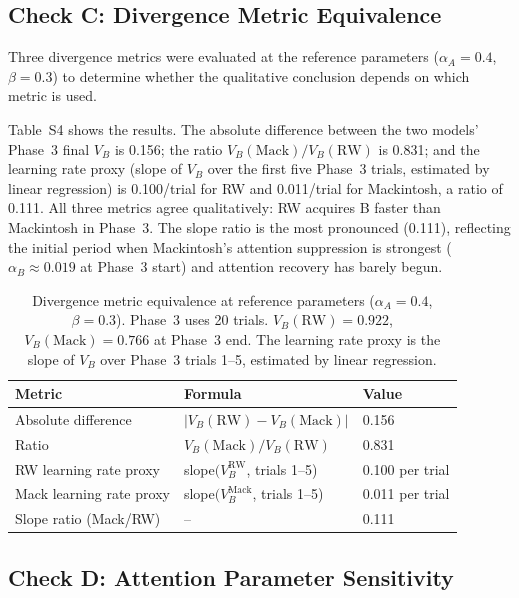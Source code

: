\documentclass[11pt,a4paper]{article}
\begin{document}
\subsection{Check C: Divergence Metric Equivalence}
\label{sec:s2c}

Three divergence metrics were evaluated at the reference parameters ($\alpha_A = 0.4$, $\beta = 0.3$) to determine whether the qualitative conclusion depends on which metric is used.

Table~S4 shows the results. The absolute difference between the two models' Phase~3 final $V_B$ is 0.156; the ratio $V_B(\text{Mack})/V_B(\text{RW})$ is 0.831; and the learning rate proxy (slope of $V_B$ over the first five Phase~3 trials, estimated by linear regression) is 0.100/trial for RW and 0.011/trial for Mackintosh, a ratio of 0.111. All three metrics agree qualitatively: RW acquires B faster than Mackintosh in Phase~3. The slope ratio is the most pronounced (0.111), reflecting the initial period when Mackintosh's attention suppression is strongest ($\alpha_B \approx 0.019$ at Phase~3 start) and attention recovery has barely begun.

\begin{table}[htbp]
\centering
\small
\caption{Divergence metric equivalence at reference parameters ($\alpha_A = 0.4$, $\beta = 0.3$). Phase~3 uses 20 trials. $V_B(\text{RW}) = 0.922$, $V_B(\text{Mack}) = 0.766$ at Phase~3 end. The learning rate proxy is the slope of $V_B$ over Phase~3 trials 1--5, estimated by linear regression.}
\label{tab:s4_metric}
\begin{tabular}{lll}
\toprule
Metric & Formula & Value \\
\midrule
Absolute difference & $|V_B(\text{RW}) - V_B(\text{Mack})|$ & 0.156 \\
Ratio & $V_B(\text{Mack}) / V_B(\text{RW})$ & 0.831 \\
RW learning rate proxy & slope$(V_B^{\text{RW}}$, trials 1--5) & 0.100 per trial \\
Mack learning rate proxy & slope$(V_B^{\text{Mack}}$, trials 1--5) & 0.011 per trial \\
Slope ratio (Mack/RW) & -- & 0.111 \\
\bottomrule
\end{tabular}
\end{table}

\subsection{Check D: Attention Parameter Sensitivity}
\label{sec:s2d}
\end{document}
